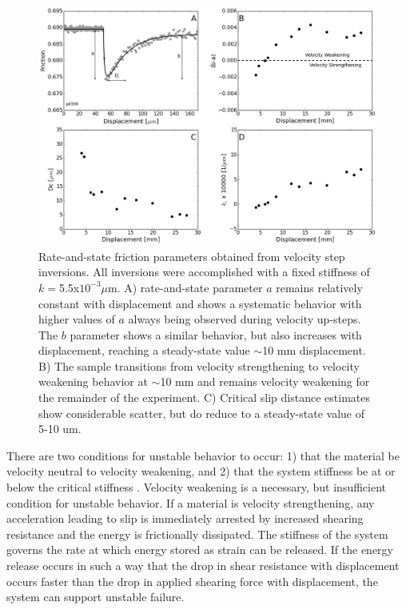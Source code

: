\documentclass[11pt]{article}
\begin{document}
\begin{figure}
    \centering
        \includegraphics[scale=0.45]{../Figures/Fig_RSF_Parameters/RSF_Parameters.png}
       \caption{Rate-and-state friction parameters obtained from velocity step
       inversions. All inversions were accomplished with a fixed stiffness of
       $k=$5.5x$10 ^ {-3} \mu$m. A) rate-and-state parameter $a$ remains relatively
       constant with displacement and shows a systematic behavior with higher
       values of $a$ always being observed during velocity up-steps. The $b$
       parameter shows a similar behavior, but also increases with displacement,
       reaching a steady-state value $\sim$10 mm displacement. B) The sample
       transitions from velocity strengthening to velocity weakening  behavior
       at $\sim$10 mm and remains velocity weakening for the remainder of  the
       experiment. C) Critical slip distance estimates show considerable
       scatter,  but do reduce to a steady-state value of 5-10 um.}
      \label{Figure:RSF Props}
\end{figure}

There are two conditions for unstable behavior to occur: 1) that the material be
velocity neutral to velocity weakening, and 2) that the system stiffness be at
or below the critical stiffness \cite{Marone:1998, Scholz:2002}. Velocity
weakening is a necessary, but insufficient condition for unstable behavior. If a
material is velocity strengthening, any acceleration leading to slip is
immediately arrested by increased shearing resistance and the energy is
frictionally dissipated. The stiffness of the system governs the rate at which
energy stored as strain can be released. If the energy release occurs in such a
way that the drop in shear resistance with displacement occurs faster than the
drop in applied shearing force with displacement, the system can support
unstable failure.
\end{document}
